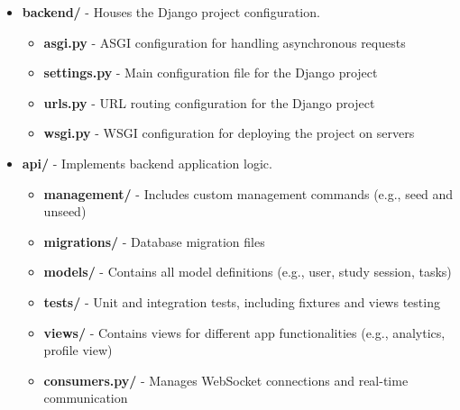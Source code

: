 \documentclass[a4paper,12pt]{article}
\begin{document}
\begin{itemize}
\begin{itemize}
    \end{itemize}



    \item \textbf{backend/} - Houses the Django project configuration.

    \begin{itemize}

        \item \textbf{asgi.py} - ASGI configuration for handling asynchronous requests

    \item \textbf{settings.py} - Main configuration file for the Django project

    \item \textbf{urls.py} - URL routing configuration for the Django project

    \item \textbf{wsgi.py} - WSGI configuration for deploying the project on servers

    \end{itemize}



    \item \textbf{api/} - Implements backend application logic.

    \begin{itemize}

        \item \textbf{management/} - Includes custom management commands (e.g., seed and unseed)

            \item \textbf{migrations/} - Database migration files

            \item \textbf{models/} - Contains all model definitions (e.g., user, study session, tasks)

            \item \textbf{tests/} - Unit and integration tests, including fixtures and views testing

            \item \textbf{views/} - Contains views for different app functionalities (e.g., analytics, profile view)

            \item \textbf{consumers.py/} - Manages WebSocket connections and real-time communication

    \end{itemize}

\end{itemize}
\end{document}
